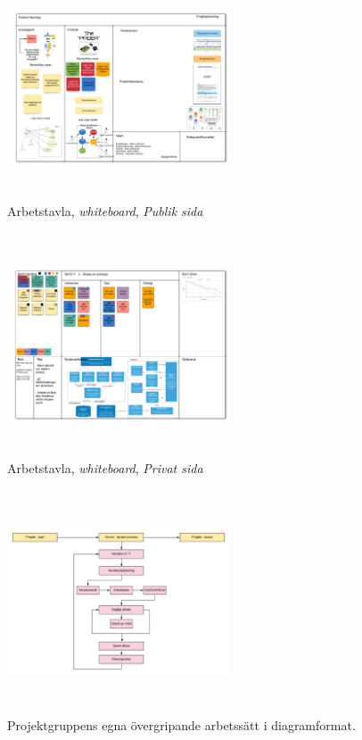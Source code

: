 \documentclass[conference]{IEEEtran}
\begin{document}
\begin{figure}[htbp]
    \centerline{\includegraphics[max height=250px, max width=250px]{images/ArbetstavlaPublik.png}}
    \caption{Arbetstavla, \textit{whiteboard}, \textit{Publik sida}}
    \label{fig:ArbetstavlaPublik}
\end{figure}

\begin{figure}[htbp]
    \centerline{\includegraphics[max height=250px, max width=250px]{images/ArbetstavlaPrivat.png}}
    \caption{Arbetstavla, \textit{whiteboard}, \textit{Privat sida}}
    \label{fig:ArbetstavlaPrivat}
\end{figure}

\begin{figure}[htbp]
    \centerline{\includegraphics[max height=250px, max width=250px]{images/DiagramArbetsstruktur.png}}
    \caption{Projektgruppens egna övergripande arbetssätt i diagramformat.}
    \label{fig:DiagramArbetsstruktur}
\end{figure}
\end{document}
